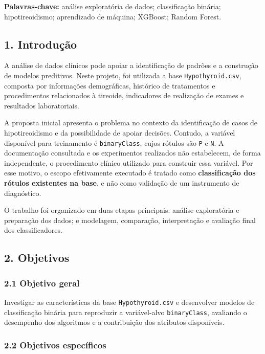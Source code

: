\documentclass[
]{article}
\begin{document}
\textbf{Palavras-chave:} análise exploratória de dados; classificação
binária; hipotireoidismo; aprendizado de máquina; XGBoost; Random
Forest.

\hypertarget{introduuxe7uxe3o}{%
\subsection{1. Introdução}\label{introduuxe7uxe3o}}

A análise de dados clínicos pode apoiar a identificação de padrões e a
construção de modelos preditivos. Neste projeto, foi utilizada a base
\texttt{Hypothyroid.csv}, composta por informações demográficas,
histórico de tratamentos e procedimentos relacionados à tireoide,
indicadores de realização de exames e resultados laboratoriais.

A proposta inicial apresenta o problema no contexto da identificação de
casos de hipotireoidismo e da possibilidade de apoiar decisões. Contudo,
a variável disponível para treinamento é \texttt{binaryClass}, cujos
rótulos são \texttt{P} e \texttt{N}. A documentação consultada e os
experimentos realizados não estabelecem, de forma independente, o
procedimento clínico utilizado para construir essa variável. Por esse
motivo, o escopo efetivamente executado é tratado como
\textbf{classificação dos rótulos existentes na base}, e não como
validação de um instrumento de diagnóstico.

O trabalho foi organizado em duas etapas principais: análise
exploratória e preparação dos dados; e modelagem, comparação,
interpretação e avaliação final dos classificadores.

\hypertarget{objetivos}{%
\subsection{2. Objetivos}\label{objetivos}}

\hypertarget{objetivo-geral}{%
\subsubsection{2.1 Objetivo geral}\label{objetivo-geral}}

Investigar as características da base \texttt{Hypothyroid.csv} e
desenvolver modelos de classificação binária para reproduzir a
variável-alvo \texttt{binaryClass}, avaliando o desempenho dos
algoritmos e a contribuição dos atributos disponíveis.

\hypertarget{objetivos-especuxedficos}{%
\subsubsection{2.2 Objetivos
específicos}\label{objetivos-especuxedficos}}
\end{document}
